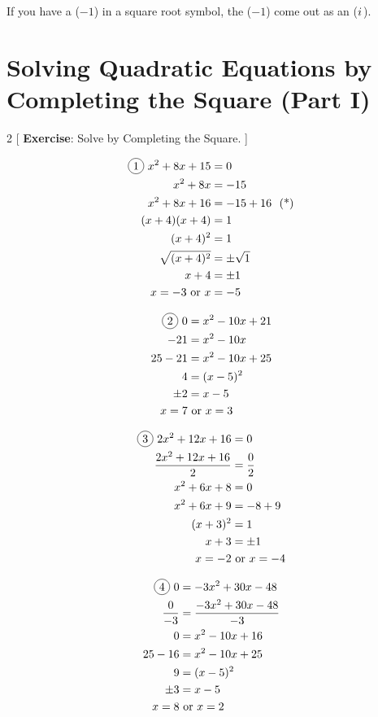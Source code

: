 If you have a ($-1$) in a square root symbol, the ($-1$) come out as an (${i\mkern1mu}$).

\section{Solving Quadratic Equations by Completing the Square (Part I)}

\newpage

\begin{multicols}{2}
[
  \textbf{Exercise}: Solve by Completing the Square.
]

\begin{align*}
  \circled{1}\ x^{2}+8x+15&=0\\
  x^{2}+8x&=-15\\
  x^{2}+8x+16&=-15+16\ \text{ (*)}\\
  (x+4)(x+4)&=1\\
  (x+4)^{2}&=1\\
  \sqrt{(x+4)^{2}}&=\pm\sqrt{1}\\
  x+4&=\pm 1\\
  x=-3 \text{ or }x&=-5
\end{align*}

\begin{align*}
  \circled{2}\ 0&=x^{2}-10x+21\\
  -21&=x^{2}-10x\\
  25-21&=x^{2}-10x+25\\
  4&=(x-5)^{2}\\
  \pm 2&=x-5\\
  x=7 &\text{ or }x=3
\end{align*}

\begin{align*}
  \circled{3}\ 2x^{2}+12x+16&=0\\
  \frac{2x^{2}+12x+16}{2}&=\frac{0}{2}\\
  x^{2}+6x+8&=0\\
  x^{2}+6x+9&=-8+9\\
  (x+3)^{2}&=1\\
  x+3&=\pm 1\\
  x=-2 &\text{ or }x=-4
\end{align*}

\begin{align*}
  \circled{4}\ 0&=-3x^{2}+30x-48\\
  \frac{0}{-3}&=\frac{-3x^{2}+30x-48}{-3}\\
  0&=x^{2}-10x+16\\
  25-16&=x^{2}-10x+25\\
  9&=(x-5)^{2}\\
  \pm 3&=x-5\\
  x=8 &\text{ or }x=2
\end{align*}
\end{multicols}

